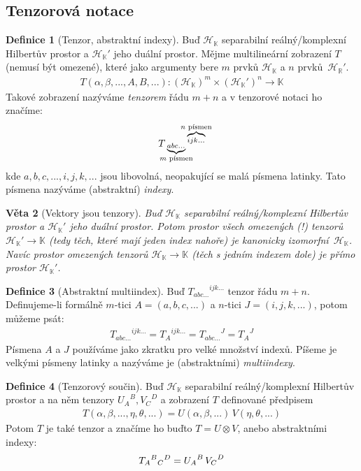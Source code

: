 \documentclass[10pt,a4paper]{report}
\newtheorem{theorem}{Věta}[section]
\theoremstyle{definition}
\newtheorem{definition}[theorem]{Definice}
\def\vph{\vphantom}
\def\czw{\mathclap}
\def\R{\mathbb{R}}
\def\K{\mathbb{K}}
\def\H{\mathcal{H}}
\begin{document}
\subsection{Tenzorová notace}
\begin{definition}[Tenzor, abstraktní indexy]
    Buď $\H_\K$ separabilní reálný/komplexní Hilbertův prostor a ${\H_\K}'$ jeho duální prostor. Mějme multilineární zobrazení $T$ (nemusí být omezené), které jako argumenty bere $m$ prvků $\H_\K$ a $n$ prvků~${\H_\R}'$.
    \begin{align*}
        T(\alpha, \beta, ..., A, B, ...): (\H_\K)^m \times ({\H_\K}')^n \to \K
    \end{align*}
    Takové zobrazení nazýváme \textit{tenzorem} řádu $m + n$ a v tenzorové notaci ho značíme:
    \begin{align*}
        T
        \underbrace{\vph{T}_{abc...}}_{\czw{m \text{ písmen}}}
        \overbrace{\vph{T}^{ijk...}}^{\czw{n \text{ písmen}}}
    \end{align*}
    kde $a,b,c,...,i,j,k,...$ jsou libovolná, neopakující se malá písmena latinky. Tato písmena nazýváme (abstraktní) \textit{indexy}.
\end{definition}
\begin{theorem}[Vektory jsou tenzory]
    Buď $\H_\K$ separabilní reálný/komplexní Hilbertův prostor a ${\H_\K}'$ jeho duální prostor. Potom prostor všech omezených (!) tenzorů ${\H_\K}' \to \K$ (tedy těch, které mají jeden index nahoře) je kanonicky izomorfní~$\H_\K$. Navíc prostor omezených tenzorů $\H_\K \to \K$ (těch s jedním indexem dole) je přímo prostor ${\H_\K}'$.
\end{theorem}
\begin{definition}[Abstraktní multiindex]
    Buď ${T_{abc...}}^{ijk...}$ tenzor řádu $m + n$. Definujeme-li formálně $m$-tici $A=(a,b,c,...)$ a $n$-tici $J=(i,j,k,...)$, potom můžeme psát:
    \begin{align*}
        {T_{abc...}}^{ijk...}
        = {T_A}^{ijk...}
        = {T_{abc...}}^J
        = {T_A}^J
    \end{align*}
    Písmena $A$ a $J$ používáme jako zkratku pro velké množství indexů. Píšeme je velkými písmeny latinky a nazýváme je (abstraktními) \textit{multiindexy}.
\end{definition}
\begin{definition}[Tenzorový součin]
    Buď $\H_\K$ separabilní reálný/komplexní Hilbertův prostor a na něm tenzory ${U_A}^B, {V_C}^D$ a zobrazení $T$ definované předpisem
    \begin{align*}
        T(\alpha, \beta, ..., \eta, \theta, ...)
        = U(\alpha, \beta, ...) \, V(\eta, \theta, ...)
    \end{align*}
    Potom $T$ je také tenzor a značíme ho buďto $T=U\otimes V$, anebo abstraktními indexy:
    \begin{align*}
        T_A\vph{T}^B\vph{T}_C\vph{T}^D = {U_A}^B \, {V_C}^D
    \end{align*}
\end{definition}
\end{document}

